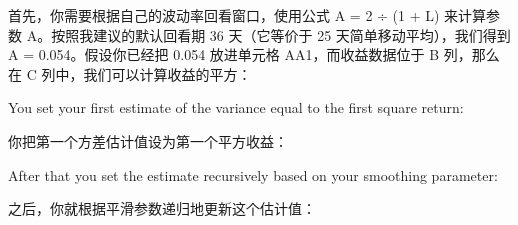 \begin{chineseblock}首先，你需要根据自己的波动率回看窗口，使用公式 A = 2 ÷ (1 + L) 来计算参数 A。按照我建议的默认回看期 36 天（它等价于 25 天简单移动平均），我们得到 A = 0.054。假设你已经把 0.054 放进单元格 AA1，而收益数据位于 B 列，那么在 C 列中，我们可以计算收益的平方：\end{chineseblock}

\begin{quote}
\begingroup\color{\englishbodycolorname} \ttfamily{} \endgroup
\end{quote}

\begin{englishblock} You set your first estimate of the variance equal to the first square return: \end{englishblock}

\begin{chineseblock}你把第一个方差估计值设为第一个平方收益：\end{chineseblock}

\begin{quote}
\begingroup\color{\englishbodycolorname} \ttfamily{} \endgroup
\end{quote}

\begin{englishblock} After that you set the estimate recursively based on your smoothing parameter: \end{englishblock}

\begin{chineseblock}之后，你就根据平滑参数递归地更新这个估计值：\end{chineseblock}

\begin{quote}
\begingroup\color{\englishbodycolorname} \ttfamily{} \ttfamily{} \endgroup
\end{quote}


\begin{quote}
\begingroup\color{\englishbodycolorname} \ttfamily{} \endgroup
\end{quote}
